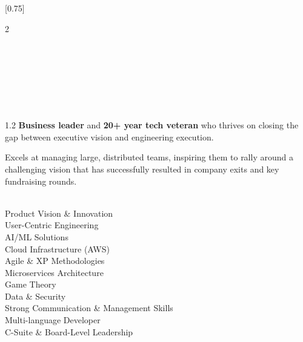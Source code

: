 \documentclass[grayscale]{simplecv}
\begin{document}
\setlength{\columnsep}{1.5cm}
[0.75]
\begin{paracol}{2}

\paracolbackgroundoptions

\footnotesize
{\setasidefontcolour
\flushleft
\href{mailto:redacted-email-address}{} \\[0.8em]
\href{tel:redacted-phone-number}{} \\[0.8em]
\href{https://linkedin.com/in/beaunbrewer}{} \\[0.8em]
\href{""}{} \\[0.8em]

\flushright

\vspace{4em}

\\[0.8em]

\begin{spacing}{1.2}
\footnotesize
\textbf{Business leader} and \textbf{20+ year tech veteran} who thrives on closing the gap between executive vision and engineering execution.

%

\vspace{0.8em}

Excels at managing large, distributed teams, inspiring them to rally around a challenging vision that has successfully resulted in company exits and key fundraising rounds.
\end{spacing}

\sidebarSectionSpace

 \\[0.8em]

Product Vision \& Innovation \\[0.6em]
User-Centric Engineering \\[0.6em]
AI/ML Solutions \\[0.6em]
Cloud Infrastructure (AWS) \\[0.6em]
Agile \& XP Methodologies \\[0.6em]
Microservices Architecture \\[0.6em]
Game Theory \\[0.6em]
Data \& Security \\[0.6em]
Strong Communication \& Management Skills \\[0.6em]
Multi-language Developer \\[0.6em]
C-Suite \& Board-Level Leadership \\[0.6em]

}
\end{paracol}
\end{document}

